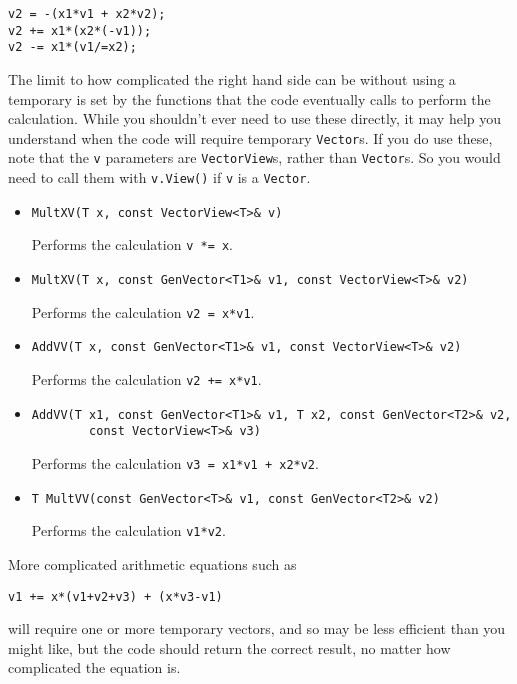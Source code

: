 \documentclass[twoside,letterpaper,11pt]{article}
\renewcommand{\tt}[1]{{\texttt {#1}}}
\begin{document}
\begin{verbatim}
v2 = -(x1*v1 + x2*v2);
v2 += x1*(x2*(-v1));
v2 -= x1*(v1/=x2);
\end{verbatim}

The limit to how complicated the right hand side can be without using a 
temporary is set by the 
functions that the code eventually calls to perform the calculation.  
While you shouldn't ever
need to use these directly, it may help you understand when the code will require 
temporary \tt{Vector}s.  If you do use these, note that the \tt{v} parameters
are \tt{VectorView}s, rather than \tt{Vector}s.  So you would need to 
call them with \tt{v.View()} if \tt{v} is a \tt{Vector}.

\begin{itemize}

\item
\begin{verbatim}
MultXV(T x, const VectorView<T>& v)
\end{verbatim}
Performs the calculation \tt{v *= x}.

\item
\begin{verbatim}
MultXV(T x, const GenVector<T1>& v1, const VectorView<T>& v2)
\end{verbatim}
Performs the calculation \tt{v2 = x*v1}.

\item
\begin{verbatim}
AddVV(T x, const GenVector<T1>& v1, const VectorView<T>& v2)
\end{verbatim}
Performs the calculation \tt{v2 += x*v1}.

\item
\begin{verbatim}
AddVV(T x1, const GenVector<T1>& v1, T x2, const GenVector<T2>& v2,
        const VectorView<T>& v3)
\end{verbatim}
Performs the calculation \tt{v3 = x1*v1 + x2*v2}.

\item
\begin{verbatim}
T MultVV(const GenVector<T>& v1, const GenVector<T2>& v2)
\end{verbatim}
Performs the calculation \tt{v1*v2}.

\end{itemize}

More complicated arithmetic equations such as
\begin{verbatim}
v1 += x*(v1+v2+v3) + (x*v3-v1) 
\end{verbatim}
will require one or more temporary vectors, and so may be less efficient than 
you might like, but the code should return the correct result, no matter
how complicated the equation is.
\end{document}
